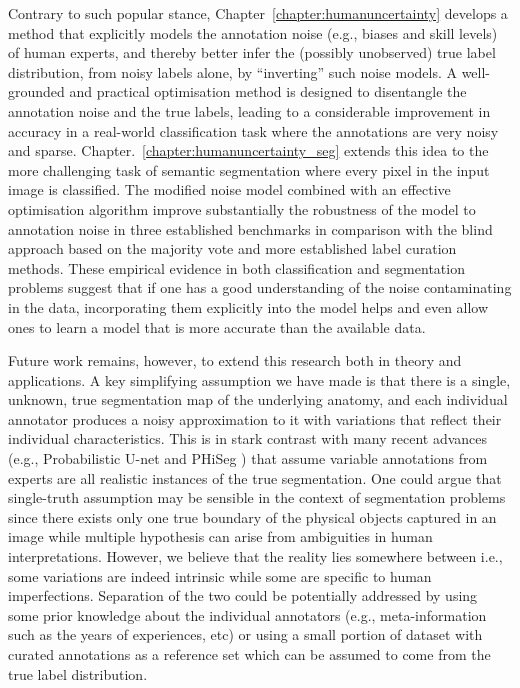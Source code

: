 Contrary to such popular stance, Chapter~\ref{chapter:humanuncertainty} develops a method that explicitly models the annotation noise  (e.g., biases and skill levels) of human experts, and thereby better infer the (possibly unobserved) true label distribution, from noisy labels alone, by ``inverting'' such noise models. A well-grounded and practical optimisation method is designed to disentangle the annotation noise and the true labels, leading to a considerable improvement in accuracy in a real-world classification task where the annotations are very noisy and sparse. Chapter.~\ref{chapter:humanuncertainty_seg} extends this idea to the more challenging task of semantic segmentation where every pixel in the input image is classified. The modified noise model combined with an effective optimisation algorithm improve substantially the robustness of the model to annotation noise in three established benchmarks in comparison with the blind approach based on the majority vote and more established label curation methods. These empirical evidence in both classification and segmentation problems suggest that if one has a good understanding of the noise contaminating in the data, incorporating them explicitly into the model helps and even allow ones to learn a model that is more accurate than the available data.  

Future work remains, however, to extend this research both in theory and applications. A key simplifying assumption we have made is that there is a single, unknown, true segmentation map of the underlying anatomy, and each individual annotator produces a noisy approximation to it with variations that reflect their individual characteristics. This is in stark contrast with many recent advances (e.g., Probabilistic U-net \cite{kohl2018probabilistic} and PHiSeg \cite{baumgartner2019phiseg}) that assume variable annotations from experts are all realistic instances of the true segmentation. One could argue that single-truth assumption may be sensible in the context of segmentation problems since there exists only one true boundary of the physical objects captured in an image while multiple hypothesis can arise from ambiguities in human interpretations. However, we believe that the reality lies somewhere between i.e., some variations are indeed intrinsic while some are specific to human imperfections. Separation of the two could be potentially addressed by using some prior knowledge about the individual annotators (e.g., meta-information such as the years of experiences, etc) \cite{raykar2009supervised} or using a small portion of dataset with curated annotations as a reference set which can be assumed to come from the true label distribution. 

